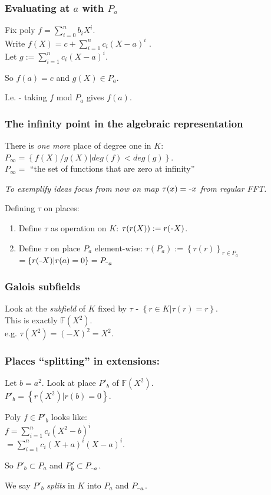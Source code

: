 \documentclass[shadesubsections,compress,14pt,mathserif]{beamer}
\newcommand{\minus}{\scalebox{0.5}[1.0]{\( - \)}}
\newcommand{\F}{\ensuremath{{\mathbb F}}}
\newcommand{\set}[1]{\ensuremath{\left\{#1\right\}}}
\newcommand{\sett}[2]{\ensuremath{\left\{#1\right\}_{#2}}}
\newcommand{\defeq}{\ensuremath{:=}}
\newcommand{\nl}{\\ \pause \vspace{0.2in}}
\begin{document}
\begin{frame}
\frametitle{Evaluating at $a$ with $P_a$}
Fix poly $f=\sum_{i=0}^n b_i X^i$.\\ \pause Write
$f(X) = c + \sum_{i=1}^n c_i(X-a)^i$ .\nl
Let $g\defeq \sum_{i=1}^n c_i(X-a)^i$.\nl

So $f(a)=c$ and $g(X)\in P_a$.\nl

I.e. - taking $f$ mod $P_a$ gives $f(a)$.
\end{frame}

\begin{frame}
 \frametitle{The infinity point in the algebraic representation}
 There is \emph{one more} place of degree one in $K$:
 $P_{\infty}=\set{f(X)/g(X)|deg(f)< deg(g)}$. \nl
 $P_{\infty}=$ ``the set of functions that are zero at infinity''
 
\end{frame}
\begin{frame}
 \textit{To exemplify ideas focus from now on map $\tau(x)=\minus x$ from regular FFT.}
\end{frame}

\begin{frame}
 Defining $\tau$ on places:\pause
 \begin{enumerate}
  \item Define $\tau$ as operation on $K$: $\tau(r(X)) \defeq  r(\minus X)$.\pause
  \item Define $\tau$ on  place $P_a$ element-wise: $\tau(P_a)\defeq \sett{\tau(r)}{ r\in P_a}$\\ \pause
$  =\set{ {r(\minus X)}| r(a)=0} = P_{\minus a}$
 \end{enumerate}
% 
\end{frame}
\begin{frame}
 \frametitle{Galois subfields}
Look at the \emph{subfield} of $K$ fixed by $\tau$ - $\set{r\in K|\tau(r)=r}$. \nl
This is exactly $\F(X^2)$.\\
e.g. $\tau(X^2)=(-X)^2 = X^2$.

 
\end{frame}
\begin{frame}
 \frametitle{Places ``splitting'' in extensions:}
 Let $b=a^2$. Look at place $P'_b$ of $\F(X^2)$. \\ \pause
 $P'_b=\set{r(X^2)|r(b)=0}$.\nl
 
 Poly $f\in P'_b$ looks like:\\
 $f=\sum_{i=1}^n c_i(X^2-b)^i$ \\ \pause 
 $=\sum_{i=1}^n c_i(X+a)^i(X-a)^i$.\nl
 

So $P'_b\subset P_a$ and $P'_b\subset P_{\minus a}$.\nl

We say $P'_b$ \emph{splits} in $K$ into $P_a$ and $P_{\minus a}$.
\end{frame}
\end{document}
